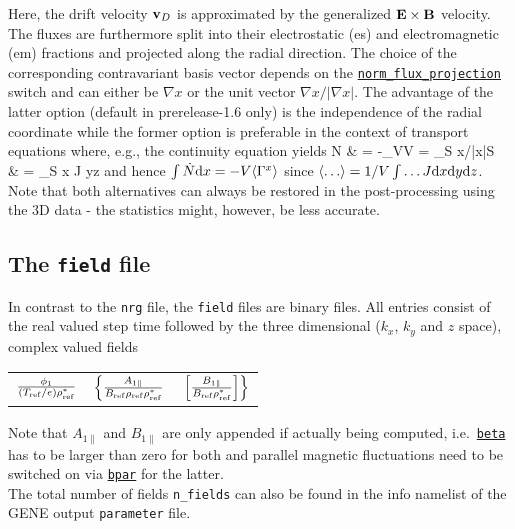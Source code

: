 \documentclass[12pt]{article}
\begin{document}
Here, the drift velocity $\mathbf{v}_D$ is approximated by the generalized $\mathbf{E}\times\mathbf{B}$ velocity.
The fluxes are furthermore split into their electrostatic (es) and electromagnetic (em) fractions and
projected along the radial direction. The choice of the corresponding contravariant basis vector depends on
the \hyperlink{norm_flux_projection}{\tt norm\_flux\_projection} switch and can either be
$\nabla x$ or the unit vector $\nabla x / |\nabla x |$. The advantage of the latter option
(default in prerelease-1.6 only) is the independence of the radial coordinate while the former
option is preferable in the context of transport equations where, e.g., the continuity equation yields
\bea
\dot N & = -\int_V\D V = \int_S \mvec{\Gamma}\cdot\nabla x/|\nabla x|\D S \nn \\
 & = \int_S \mvec{\Gamma}\cdot\nabla x J \D y\D z \nn
\eea
and hence $\int \dot N \text{d} x = -V \langle \Gamma^x \rangle$ since $\langle \ldots  \rangle = 1/V \int \ldots J \text{d} x \text{d} y \text{d} z$.
Note that both alternatives can always be restored in the post-processing using the 3D data - the
statistics might, however, be less accurate.

\subsection{The \texttt{field} file}
\label{subsec:field-file}
In contrast to the \texttt{nrg} file, the \texttt{field} files are binary files.
All entries consist of the real valued step time followed by the three
dimensional ($k_x$, $k_y$ and $z$ space), complex valued fields
\begin{center}
\begin{tabular}{lll}
$\frac{\phi_1}{(T_{\rm ref}/e)\rho_{\rm ref}^*}$ &
$\left\{\frac{A_{1\|}}{B_{\rm ref} \rho_{\rm ref} \rho_{\rm ref}^*} \right.$ &
$\left. \left[ \frac{B_{1\|}}{B_{\rm ref} \rho_{\rm ref}^*} \right]\right\}$
\end{tabular}
\end{center}
Note that $A_{1\|}$ and $B_{1\|}$ are only appended if actually being computed,
i.e.~\hyperlink{beta}{\tt beta} has to be larger than zero for both and
parallel magnetic fluctuations need to be switched on via \hyperlink{bpar}{\tt bpar}
for the latter.\\
The total number of fields {\tt n\_fields} can also be found in the info namelist
 of the {\sc GENE} output {\tt parameter} file.
\end{document}
